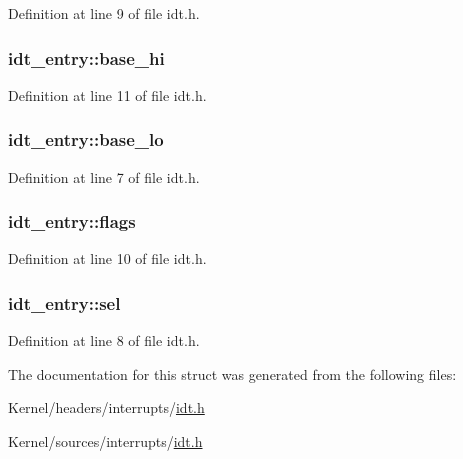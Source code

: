 Definition at line 9 of file idt.h.

\hypertarget{structidt__entry_ad4836498023a53a3eb32cd278a30f27d}{
\subsubsection[{base\_\-hi}]{ {\bf idt\_\-entry::base\_\-hi}}}
\label{structidt__entry_ad4836498023a53a3eb32cd278a30f27d}


Definition at line 11 of file idt.h.

\hypertarget{structidt__entry_ad5d8ba8d3e252910fda030bfd3a0a4fa}{
\subsubsection[{base\_\-lo}]{ {\bf idt\_\-entry::base\_\-lo}}}
\label{structidt__entry_ad5d8ba8d3e252910fda030bfd3a0a4fa}


Definition at line 7 of file idt.h.

\hypertarget{structidt__entry_a630f3c16426126a6040aeb98f7802000}{
\subsubsection[{flags}]{ {\bf idt\_\-entry::flags}}}
\label{structidt__entry_a630f3c16426126a6040aeb98f7802000}


Definition at line 10 of file idt.h.

\hypertarget{structidt__entry_a553cf62213ff6685d8344eedb1ea6fd7}{
\subsubsection[{sel}]{ {\bf idt\_\-entry::sel}}}
\label{structidt__entry_a553cf62213ff6685d8344eedb1ea6fd7}


Definition at line 8 of file idt.h.



The documentation for this struct was generated from the following files:\begin{DoxyCompactItemize}
\item 
Kernel/headers/interrupts/\hyperlink{headers_2interrupts_2idt_8h}{idt.h}\item 
Kernel/sources/interrupts/\hyperlink{sources_2interrupts_2idt_8h}{idt.h}\end{DoxyCompactItemize}
